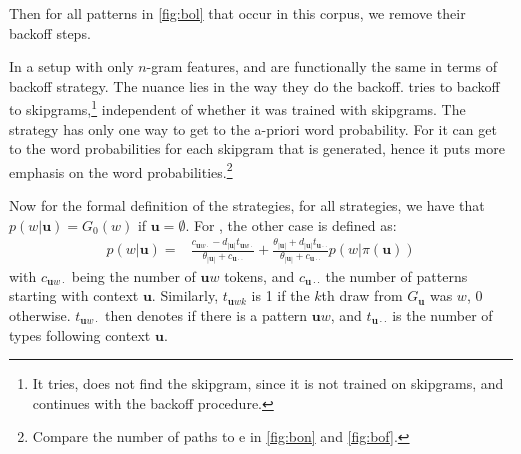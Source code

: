 Then for all patterns in \cref{fig:bol} that occur in this corpus, we remove their backoff steps.



In a setup with only $n$-gram features, \BON and \BOF are functionally the same in terms of backoff strategy. The nuance lies in the way they do the backoff. \BOF tries to backoff to skipgrams,\footnote{It tries, does not find the skipgram, since it is not trained on skipgrams, and continues with the backoff procedure.} independent of whether it was trained with skipgrams. The \BON strategy has only one way to get to the a-priori word probability. 
For \BOF it can get to the word probabilities for each skipgram that is generated, hence it puts more emphasis on the word probabilities.\footnote{Compare the number of paths to e in \cref{fig:bon} and \cref{fig:bof}.}

Now for the formal definition of the strategies, for all strategies, we have that $p(w|\mathbf{u})=G_0(w)$ if $\mathbf{u} = \emptyset$. For \BON, the other case is defined as:
  \begin{equation}\begin{split}
  	p(w|\mathbf{u})= &
\frac{c_{\mathbf{u}w\cdot}-d_{|\mathbf{u}|}t_{\mathbf{u}w\cdot}}{\theta_{|\mathbf{u}|}+c_{\mathbf{u}\cdot\cdot}} +
\frac{\theta_{|\mathbf{u}|}+d_{|\mathbf{u}|}t_{\mathbf{u}\cdot\cdot}}{\theta_{|\mathbf{u}|}+c_{\mathbf{u}\cdot\cdot}}
p(w|\pi(\mathbf{u}))
  \end{split}\end{equation}
with $c_{\mathbf{u}w\cdot}$ being the number of $\mathbf{u}w$ tokens, and $c_{\mathbf{u}\cdot\cdot}$ the number of patterns starting with context $\mathbf{u}$. Similarly, $t_{\mathbf{u}wk}$ is 1 if the $k$th draw from $G_{\mathbf{u}}$ was $w$, 0 otherwise. $t_{\mathbf{u}w\cdot}$ then denotes if there is a pattern $\mathbf{u}w$, and $t_{\mathbf{u}\cdot\cdot}$ is the number of types following context $\mathbf{u}$.
  
